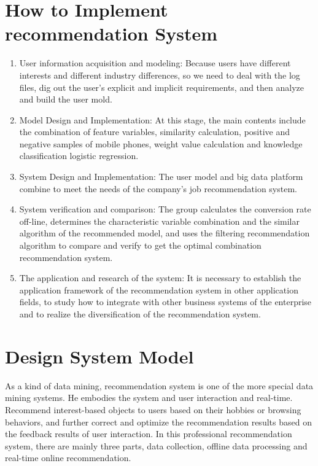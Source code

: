 \documentclass[sigconf]{acmart}
\begin{document}
\section{How to Implement recommendation System}
\begin{enumerate}
  \item  User information acquisition and modeling: Because users have different interests and different industry differences, so we need to deal with the log files, dig out the user's explicit and implicit requirements, and then analyze and build the user mold.
  \item Model Design and Implementation: At this stage, the main contents include the combination of feature variables, similarity calculation, positive and negative samples of mobile phones, weight value calculation and knowledge classification logistic regression.
  \item System Design and Implementation: The user model and big data platform combine to meet the needs of the company's job recommendation system.
  \item System verification and comparison: The group calculates the conversion rate off-line, determines the characteristic variable combination and the similar algorithm of the recommended model, and uses the filtering recommendation algorithm to compare and verify to get the optimal combination recommendation system.
  \item The application and research of the system: It is necessary to establish the application framework of the recommendation system in other application fields, to study how to integrate with other business systems of the enterprise and to realize the diversification of the recommendation system.

\end{enumerate}



\section{Design System Model}
As a kind of data mining, recommendation system is one of the more special data mining systems. He embodies the system and user interaction and real-time. Recommend interest-based objects to users based on their hobbies or browsing behaviors, and further correct and optimize the recommendation results based on the feedback results of user interaction. In this professional recommendation system, there are mainly three parts, data collection, offline data processing and real-time online recommendation.
\end{document}
